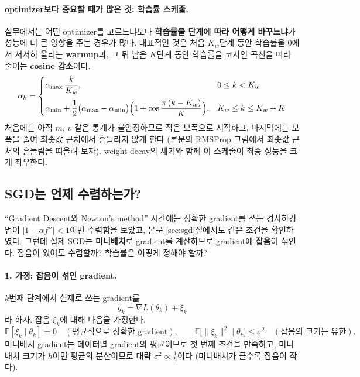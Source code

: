 \documentclass[11pt,a4paper]{article}
\begin{document}
\paragraph{optimizer보다 중요할 때가 많은 것: 학습률 스케줄.}
실무에서는 어떤 optimizer를 고르느냐보다 \textbf{학습률을 단계에 따라 어떻게 바꾸느냐}가
성능에 더 큰 영향을 주는 경우가 많다. 대표적인 것은
처음 $K_w$단계 동안 학습률을 $0$에서 서서히 올리는 \textbf{warmup}과,
그 뒤 남은 $K$단계 동안 학습률을 코사인 곡선을 따라 줄이는 \textbf{cosine 감소}이다.
\[
\alpha_k=
\begin{cases}
\alpha_{\max}\,\dfrac{k}{K_w}, & 0\le k<K_w\\[10pt]
\alpha_{\min}+\dfrac12\bigl(\alpha_{\max}-\alpha_{\min}\bigr)\Bigl(1+\cos\dfrac{\pi\,(k-K_w)}{K}\Bigr), & K_w\le k\le K_w+K
\end{cases}
\]
처음에는 아직 $m$, $v$ 같은 통계가 불안정하므로 작은 보폭으로 시작하고,
마지막에는 보폭을 줄여 최솟값 근처에서 흔들리지 않게 한다
(본문의 RMSProp 그림에서 최솟값 근처의 흔들림을 떠올려 보자).
weight decay의 세기와 함께 이 스케줄이 최종 성능을 크게 좌우한다.

\subsection{SGD는 언제 수렴하는가?}\label{app:sgdconv}

``Gradient Descent와 Newton's method'' 시간에는 정확한 gradient를 쓰는 경사하강법이
$|1-\alpha f''|<1$이면 수렴함을 보았고, 본문 \ref{sec:sgd}절에서도 같은 조건을 확인하였다.
그런데 실제 SGD는 \textbf{미니배치}로 gradient를 계산하므로 gradient에 \textbf{잡음}이 섞인다.
잡음이 있어도 수렴할까? 학습률은 어떻게 정해야 할까?

\paragraph{1. 가정: 잡음이 섞인 gradient.}
$k$번째 단계에서 실제로 쓰는 gradient를
\[
\hat g_k=\nabla L(\theta_k)+\xi_k
\]
라 하자. 잡음 $\xi_k$에 대해 다음을 가정한다.
\[
\mathbb E[\xi_k\mid\theta_k]=0\quad(\text{평균적으로 정확한 gradient}),
\qquad
\mathbb E\bigl[\|\xi_k\|^2\mid\theta_k\bigr]\le\sigma^2\quad(\text{잡음의 크기는 유한}).
\]
미니배치 gradient는 데이터별 gradient의 평균이므로 첫 번째 조건을 만족하고,
미니배치 크기가 $h$이면 평균의 분산이므로 대략 $\sigma^2\propto\frac1h$이다
(미니배치가 클수록 잡음이 작다).
\end{document}
